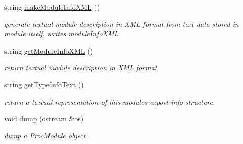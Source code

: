 \begin{DoxyCompactItemize}
\mbox{\label{classProcModule_ad0559892993237ae19152400da9216e6}} 
string \hyperlink{classProcModule_ad0559892993237ae19152400da9216e6}{make\+Module\+Info\+X\+ML} ()
\begin{DoxyCompactList}\small\item\em generate textual module description in X\+ML format from text data stored in module itself, writes module\+Info\+X\+ML \end{DoxyCompactList}\item 
\mbox{\label{classProcModule_a7274ea6967f8a29e74b3f15460d2f7d7}} 
string \hyperlink{classProcModule_a7274ea6967f8a29e74b3f15460d2f7d7}{get\+Module\+Info\+X\+ML} ()
\begin{DoxyCompactList}\small\item\em return textual module description in X\+ML format \end{DoxyCompactList}\item 
\mbox{\label{classProcModule_a3be2709976cf53033187b6dcf8c773ef}} 
string \hyperlink{classProcModule_a3be2709976cf53033187b6dcf8c773ef}{get\+Type\+Info\+Text} ()
\begin{DoxyCompactList}\small\item\em return a textual representation of this modules export info structure \end{DoxyCompactList}\item 
\mbox{\label{classProcModule_af465814c2e6d29c1a0b5d0612766a3b6}} 
void \hyperlink{classProcModule_af465814c2e6d29c1a0b5d0612766a3b6}{dump} (ostream \&os)
\begin{DoxyCompactList}\small\item\em dump a \hyperlink{classProcModule}{Proc\+Module} object \end{DoxyCompactList}\end{DoxyCompactItemize}
